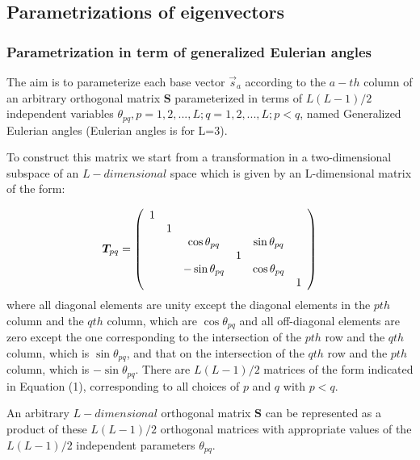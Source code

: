 \documentclass[preprint,amsmath,amssymb,superscriptaddress,showpacs,pre]{revtex4-1}
\let\originalleft\left
\let\originalright\right
\renewcommand{\left}{\mathopen{}\mathclose\bgroup\originalleft}
\renewcommand{\right}{\aftergroup\egroup\originalright}
\begin{document}



\subsection{Parametrizations of  eigenvectors } %
\label{sub:parametrizations_of_eigenvectors}
\subsubsection{Parametrization in term of generalized Eulerian angles}
The aim is to  parameterize each base vector $\vec{s}_a$ according to the $a-th$ column of an arbitrary orthogonal matrix $\bm S$ parameterized   in terms of $L(L-1)/2$ independent variables  $\theta_ {pq}, p =1,2, ..., L; q =1,2, ..., L; p <q $, named Generalized Eulerian angles (Eulerian angles is for L=3).

To construct this matrix we start from a  transformation in a two-dimensional subspace of an $L-dimensional$ space which is given by an L-dimensional matrix of the  form:

\begin{equation} 
\bm T_{pq} =  \left(
\begin{array}{cccccc}
1 &   &  &  &  &\\
 & 1& & & & \\
& & \cos\theta_{pq} & & \sin\theta_{pq}\\
& &  & 1 & &\\
& &  -\sin\theta_{pq}& & \cos\theta_{pq} &\\
& &  & &  & 1\\
\end{array}
\right)
\end{equation}
where all diagonal elements are unity except the diagonal elements in the $pth$ column and the $qth$ column, which are $\cos\theta_{pq}$ and all off-diagonal elements are zero except the one corresponding to the intersection of the $pth$ row and the $qth$ column, which is $\sin\theta_{pq}$, and that on the intersection of the $qth$ row and the $pth$ column, which is $-\sin\theta_{pq}$. There are $L(L - 1)/2$  matrices of the form indicated in Equation (1), corresponding to all choices of $p$ and $q$ with $p <q$.

An arbitrary  $L-dimensional$ orthogonal matrix $\bm S$ can be represented as a product of these $L(L-1)/2$ orthogonal matrices with appropriate values of the $L(L-1)/2$ independent parameters $\theta_{pq}$.
\end{document}
